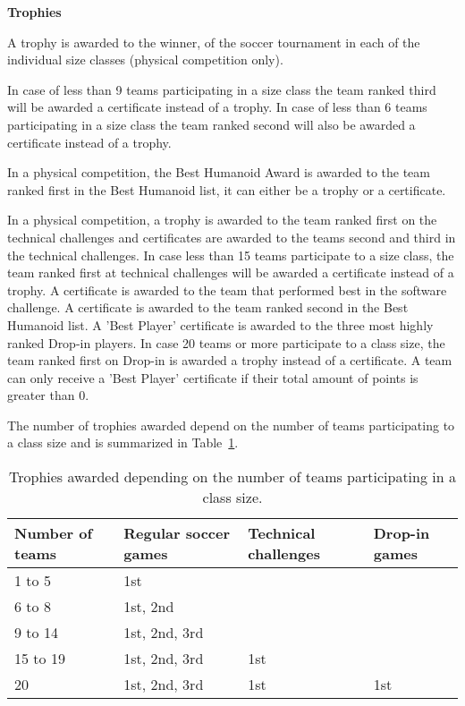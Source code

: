 \bigskip

{\bfseries Trophies}

\headlinebox

A trophy is awarded to the winner,  of the soccer tournament in each of the
individual size classes
(physical competition only).


\bigskip

In case of less than 9 teams participating in a size class the team ranked third
will be awarded a certificate instead of a trophy.
In case of less than 6 teams participating in a size class the team ranked
second will also be awarded a certificate instead of a trophy.

\bigskip

In a physical competition, the Best Humanoid Award is awarded to the team ranked first in the Best Humanoid list,
it can either be a trophy or a certificate.

\bigskip

In a physical competition, a trophy is awarded to the team ranked first
on the technical challenges and certificates are awarded to the teams second
and third in the technical challenges.
In case less than 15 teams participate to a size class, the team ranked
first at technical challenges will be awarded a certificate instead of a trophy.
A certificate is awarded to the team that performed best in the software challenge.
A certificate is awarded to the team ranked second in the Best Humanoid list.
A 'Best Player' certificate is awarded to the three most highly ranked
Drop-in players.
In case 20 teams or more participate to a class size, the team ranked first on
Drop-in is awarded a trophy instead of a certificate.
A team can only receive a 'Best Player' certificate if their total amount of
points is greater than 0.

\bigskip


  The number of trophies awarded depend on the number of teams participating to
  a class size and is summarized in Table~\ref{tab:trophies}.


\begin{table}
  \centering
  \begin{tabular}{llll}
    Number of teams & Regular soccer games & Technical challenges & Drop-in games\\
    \hline
    1 to 5 & 1st & & \\
    6 to 8 & 1st, 2nd & & \\
    9 to 14 & 1st, 2nd, 3rd & & \\
    15 to 19 & 1st, 2nd, 3rd & 1st & \\
    20 & 1st, 2nd, 3rd & 1st & 1st \\
  \end{tabular}
  \caption{Trophies awarded depending on the number of teams participating
  in a class size.}
  \label{tab:trophies}
\end{table}

